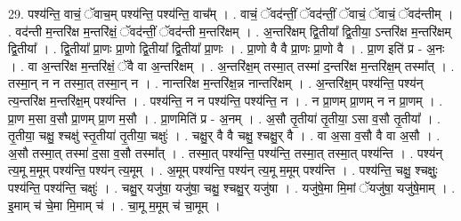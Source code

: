 \documentclass[17pt]{extarticle}
\begin{document}
29. पश्य॑न्ति॒ वाचं॒ ॅवाच॒म् पश्य॑न्ति॒ पश्य॑न्ति॒ वाच᳚म् । . वाचं॒ ॅवद॑न्तीं॒ ॅवद॑न्तीं॒ ॅवाचं॒ ॅवाचं॒ ॅवद॑न्तीम् । . वद॑न्ती म॒न्तरि॑क्ष म॒न्तरि॑क्षं॒ ॅवद॑न्तीं॒ ॅवद॑न्ती म॒न्तरि॑क्षम् । . अ॒न्तरि॑क्षम् द्वि॒तीया᳚ द्वि॒तीया॒ ऽन्तरि॑क्ष म॒न्तरि॑क्षम् द्वि॒तीया᳚ । . द्वि॒तीया᳚ प्रा॒णः प्रा॒णो द्वि॒तीया᳚ द्वि॒तीया᳚ प्रा॒णः । . प्रा॒णो वै वै प्रा॒णः प्रा॒णो वै । . प्रा॒ण इति॑ प्र - अ॒नः । . वा अ॒न्तरि॑क्ष म॒न्तरि॑क्षं॒ ॅवै वा अ॒न्तरि॑क्षम् । . अ॒न्तरि॑क्ष॒म् तस्मा॒त् तस्मा॑ द॒न्तरि॑क्ष म॒न्तरि॑क्ष॒म् तस्मा᳚त् । . तस्मा॒न् न न तस्मा॒त् तस्मा॒न् न । . नान्तरि॑क्ष म॒न्तरि॑क्ष॒न्न नान्तरि॑क्षम् । . अ॒न्तरि॑क्ष॒म् पश्य॑न्ति॒ पश्य॑न् त्य॒न्तरि॑क्ष म॒न्तरि॑क्ष॒म् पश्य॑न्ति । . पश्य॑न्ति॒ न न पश्य॑न्ति॒ पश्य॑न्ति॒ न । . न प्रा॒णम् प्रा॒णम् न न प्रा॒णम् । . प्रा॒ण म॒सा व॒सौ प्रा॒णम् प्रा॒ण म॒सौ । . प्रा॒णमिति॑ प्र - अ॒नम् । . अ॒सौ तृ॒तीया॑ तृ॒तीया॒ ऽसा व॒सौ तृ॒तीया᳚ । . तृ॒तीया॒ चक्षु॒ श्चक्षु॑ स्तृ॒तीया॑ तृ॒तीया॒ चक्षुः॑ । . चक्षु॒र् वै वै चक्षु॒ श्चक्षु॒र् वै । . वा अ॒सा व॒सौ वै वा अ॒सौ । . अ॒सौ तस्मा॒त् तस्मा॑ द॒सा व॒सौ तस्मा᳚त् । . तस्मा॒त् पश्य॑न्ति॒ पश्य॑न्ति॒ तस्मा॒त् तस्मा॒त् पश्य॑न्ति । . पश्य॑न् त्य॒मू म॒मूम् पश्य॑न्ति॒ पश्य॑न् त्य॒मूम् । . अ॒मूम् पश्य॑न्ति॒ पश्य॑न् त्य॒मू म॒मूम् पश्य॑न्ति । . पश्य॑न्ति॒ चक्षु॒ श्चक्षुः॒ पश्य॑न्ति॒ पश्य॑न्ति॒ चक्षुः॑ । . चक्षु॒र् यजु॑षा॒ यजु॑षा॒ चक्षु॒ श्चक्षु॒र् यजु॑षा । . यजु॑षे॒मा मि॒मां ॅयजु॑षा॒ यजु॑षे॒माम् । . इ॒माम् च॑ चे॒मा मि॒माम् च॑ । . चा॒मू म॒मूम् च॑ चा॒मूम् । \newline
\end{document}
